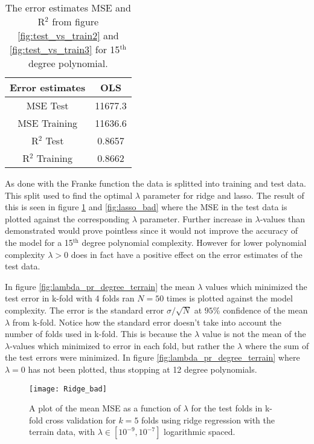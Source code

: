 \documentclass[uio,jmp,amsmath,amssymb,reprint,nofootinbib]{revtex4-1}
\numberwithin{equation}{section}
\begin{document}
\begin{table}
\begin{tabular}{|c|c|}\hline
Error estimates & OLS\\ \hline
MSE Test & 11677.3 \\ \hline
MSE Training & 11636.6 \\ \hline
R\(^2\) Test & 0.8657 \\ \hline
R\(^2\) Training & 0.8662 \\ \hline
\end{tabular}
\caption{The error estimates MSE and R\(^2\) from figure \ref{fig:test_vs_train2} and \ref{fig:test_vs_train3} for 15\(^\text{th}\) degree polynomial.}
\label{tab:08}
\end{table}

As done with the Franke function the data is splitted into training and test data. This split used to find the optimal \(\lambda\) parameter for ridge and lasso. The result of this is seen in figure \ref{fig:ridge_bad} and \ref{fig:lasso_bad} where the MSE in the test data is plotted against the corresponding \(\lambda\) parameter. Further increase in \(\lambda\)-values than demonstrated would prove pointless since it would not improve the accuracy of the model for a 15\(^\text{th}\) degree polynomial complexity. However for lower polynomial complexity \(\lambda > 0\) does in fact have a positive effect on the error estimates of the test data. 

In figure \ref{fig:lambda_pr_degree_terrain} the mean \(\lambda\) values which minimized the test error in k-fold with 4 folds ran \(N=50\) times is plotted against the model complexity. The error is the standard error \(\sigma/\sqrt{N}\) at \(95\%\) confidence of the mean \(\lambda\) from k-fold. Notice how the standard error doesn't take into account the number of folds used in k-fold. This is because the \(\lambda\) value is not the mean of the \(\lambda\)-values which minimized to error in each fold, but rather the \(\lambda\) where the sum of the test errors were minimized. In figure \ref{fig:lambda_pr_degree_terrain} where \(\lambda=0\) has not been plotted, thus stopping at 12 degree polynomials.


\begin{figure}[H]
    \centering
    \texttt{[image: Ridge\_bad]}
    \caption{A plot of the mean MSE as a function of \(\lambda\) for the test folds in k-fold cross validation for \(k=5\) folds using ridge regression with the terrain data, with \(\lambda \in [10^{-9}, 10^{-7}]\) logarithmic spaced.}
    \label{fig:ridge_bad}
\end{figure}
\end{document}
